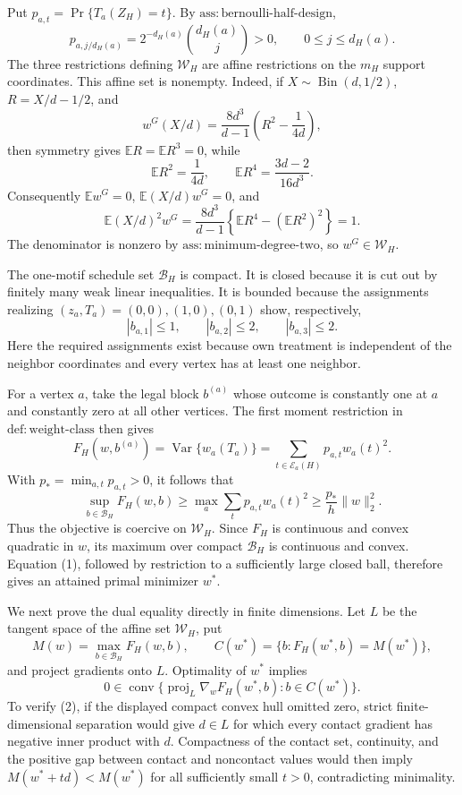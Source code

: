 Put \(p_{a,t}=\Pr\{T_a(Z_H)=t\}\).  By \(\mathrm{ass:bernoulli\text{-}half\text{-}design}\),
\[
p_{a,j/d_H(a)}=2^{-d_H(a)}\binom{d_H(a)}j>0,
\qquad 0\le j\le d_H(a).
\]
The three restrictions defining \(\mathcal W_H\) are affine restrictions on the \(m_H\) support coordinates.  This affine set is nonempty.  Indeed, if \(X\sim\operatorname{Bin}(d,1/2)\), \(R=X/d-1/2\), and
\[
w^G(X/d)=\frac{8d^3}{d-1}\left(R^2-\frac1{4d}\right),
\]
then symmetry gives \(\mathbb E R=\mathbb E R^3=0\), while
\[
\mathbb E R^2=\frac1{4d},
\qquad
\mathbb E R^4=\frac{3d-2}{16d^3}.
\]
Consequently \(\mathbb Ew^G=0\), \(\mathbb E(X/d)w^G=0\), and
\[
\mathbb E(X/d)^2w^G
=\frac{8d^3}{d-1}\left\{\mathbb ER^4-(\mathbb ER^2)^2\right\}=1.
\]
The denominator is nonzero by \(\mathrm{ass:minimum\text{-}degree\text{-}two}\), so \(w^G\in\mathcal W_H\).

The one-motif schedule set \(\mathcal B_H\) is compact.  It is closed because it is cut out by finitely many weak linear inequalities.  It is bounded because the assignments realizing \((z_a,T_a)=(0,0),(1,0),(0,1)\) show, respectively,
\[
|b_{a,1}|\le1,
\qquad |b_{a,2}|\le2,
\qquad |b_{a,3}|\le2.
\]
Here the required assignments exist because own treatment is independent of the neighbor coordinates and every vertex has at least one neighbor.

For a vertex \(a\), take the legal block \(b^{(a)}\) whose outcome is constantly one at \(a\) and constantly zero at all other vertices.  The first moment restriction in \(\mathrm{def:weight\text{-}class}\) then gives
\[
F_H(w,b^{(a)})
=\operatorname{Var}\{w_a(T_a)\}
=\sum_{t\in\mathcal E_a(H)}p_{a,t}w_a(t)^2.
\]
With \(p_*=\min_{a,t}p_{a,t}>0\), it follows that
\[
\sup_{b\in\mathcal B_H}F_H(w,b)
\ge \max_a\sum_t p_{a,t}w_a(t)^2
\ge \frac{p_*}{h}\|w\|_2^2. \tag{1}
\]
Thus the objective is coercive on \(\mathcal W_H\).  Since \(F_H\) is continuous and convex quadratic in \(w\), its maximum over compact \(\mathcal B_H\) is continuous and convex.  Equation (1), followed by restriction to a sufficiently large closed ball, therefore gives an attained primal minimizer \(w^*\).

We next prove the dual equality directly in finite dimensions.  Let \(L\) be the tangent space of the affine set \(\mathcal W_H\), put
\[
M(w)=\max_{b\in\mathcal B_H}F_H(w,b),
\qquad
C(w^*)=\{b:F_H(w^*,b)=M(w^*)\},
\]
and project gradients onto \(L\).  Optimality of \(w^*\) implies
\[
0\in\operatorname{conv}\{\operatorname{proj}_L\nabla_wF_H(w^*,b):b\in C(w^*)\}. \tag{2}
\]
To verify (2), if the displayed compact convex hull omitted zero, strict finite-dimensional separation would give \(d\in L\) for which every contact gradient has negative inner product with \(d\).  Compactness of the contact set, continuity, and the positive gap between contact and noncontact values would then imply \(M(w^*+td)<M(w^*)\) for all sufficiently small \(t>0\), contradicting minimality.

